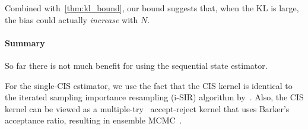 Combined with~\cref{thm:kl_bound}, our bound suggests that, when the KL is large, the bias could actually \textit{increase} with \(N\).

\vspace{-0.05in}
\paragraph{Summary}
So far there is not much benefit for using the sequential state estimator.


%

%
%
%
%
For the single-CIS estimator, we use the fact that the CIS kernel is identical to the iterated sampling importance resampling (i-SIR) algorithm by~\citet{andrieu_uniform_2018}.
Also, the CIS kernel can be viewed as a multiple-try~\citet[Table 12]{martino_review_2018a} accept-reject kernel that uses Barker's~\citep{barker_monte_1965} acceptance ratio, resulting in ensemble MCMC~\citet{austad_parallel_2007, neal_mcmc_2011a}.
%
%
%
%

